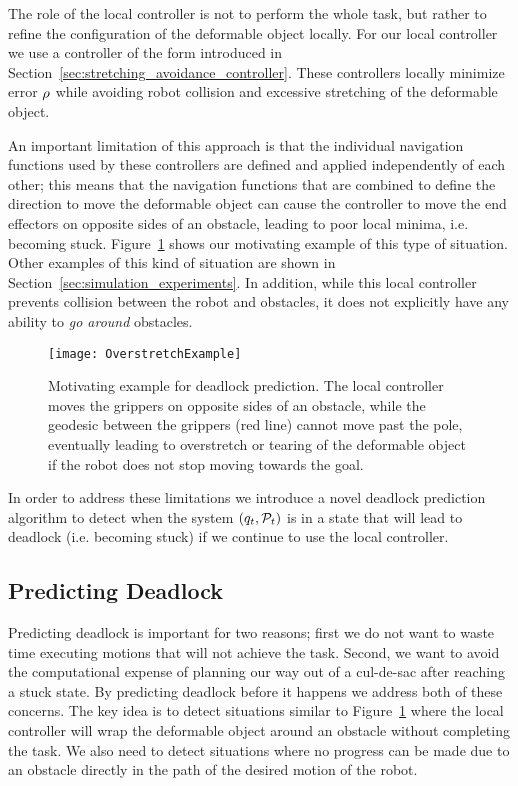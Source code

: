The role of the local controller is not to perform the whole task, but rather to refine the configuration of the deformable object locally. For our local controller we use a controller of the form introduced in Section~\ref{sec:stretching_avoidance_controller}. These controllers locally minimize error $\rho$ while avoiding robot collision and excessive stretching of the deformable object.

An important limitation of this approach is that the individual navigation functions used by these controllers are defined and applied independently of each other; this means that the navigation functions that are combined to define the direction to move the deformable object can cause the controller to move the end effectors on opposite sides of an obstacle, leading to poor local minima, i.e. becoming stuck. Figure~\ref{fig:overstretch_example} shows our motivating example of this type of situation. Other examples of this kind of situation are shown in Section~\ref{sec:simulation_experiments}. In addition, while this local controller prevents collision between the robot and obstacles, it does not explicitly have any ability to \textit{go around} obstacles.

\begin{figure}[h]
    \centering
    \texttt{[image: OverstretchExample]}
    \caption{Motivating example for deadlock prediction. The local controller moves the grippers on opposite sides of an obstacle, while the geodesic between the grippers (red line) cannot move past the pole, eventually leading to overstretch or tearing of the deformable object if the robot does not stop moving towards the goal.}
    \label{fig:overstretch_example}
\end{figure}

In order to address these limitations we introduce a novel deadlock prediction algorithm to detect when the system $(q_t, \mathcal{P}_t)$ is in a state that will lead to deadlock (i.e. becoming stuck) if we continue to use the local controller.

\subsection{Predicting Deadlock}
\label{sec:predicting_deadlock}

Predicting deadlock is important for two reasons; first we do not want to waste time executing motions that will not achieve the task. Second, we want to avoid the computational expense of planning our way out of a cul-de-sac after reaching a stuck state. By predicting deadlock before it happens we address both of these concerns. The key idea is to detect situations similar to Figure~\ref{fig:overstretch_example} where the local controller will wrap the deformable object around an obstacle without completing the task. We also need to detect situations where no progress can be made due to an obstacle directly in the path of the desired motion of the robot.

